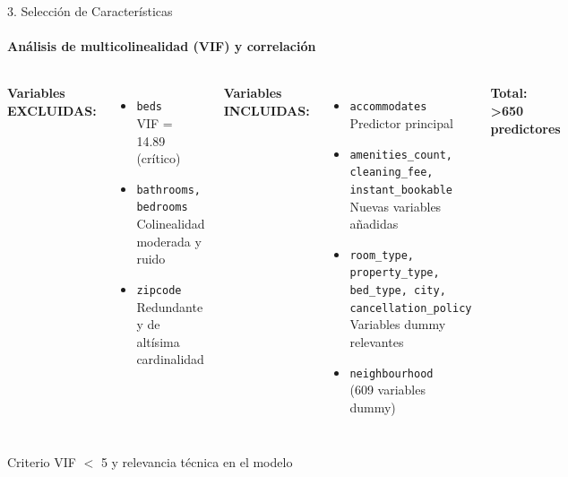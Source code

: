 \documentclass{beamer}
\begin{document}
\begin{frame}{3. Selección de Características}
  \framesubtitle{Análisis de multicolinealidad (VIF) y correlación}
  
  \begin{columns}
      \textbf{Variables EXCLUIDAS:}
      \begin{itemize}
        \item[\alert{$\times$}] \texttt{beds} \\
        VIF = 14.89 (crítico)
        \item[\alert{$\times$}] \texttt{bathrooms, bedrooms} \\
        Colinealidad moderada y ruido
        \item[\alert{$\times$}] \texttt{zipcode} \\
        Redundante y de altísima cardinalidad
      \end{itemize}
    
      \textbf{Variables INCLUIDAS:}
      \begin{itemize}
        \item[\textcolor{green}{$\checkmark$}] \texttt{accommodates} \\
        Predictor principal
        \item[\textcolor{green}{$\checkmark$}] \texttt{amenities\_count, cleaning\_fee, instant\_bookable} \\
        Nuevas variables añadidas
        \item[\textcolor{green}{$\checkmark$}] \texttt{room\_type, property\_type, bed\_type, city, cancellation\_policy} \\
        Variables dummy relevantes
        \item[\textcolor{green}{$\checkmark$}] \texttt{neighbourhood} \\
        (609 variables dummy)
      \end{itemize}
      
      \vspace{0.3cm}
      
      \textbf{Total: >650 predictores}
  \end{columns}
  
  \vspace{0.3cm}
  
  \begin{alertblock}{Criterio}
    VIF $<$ 5 y relevancia técnica en el modelo
  \end{alertblock}
\end{frame}
\end{document}
